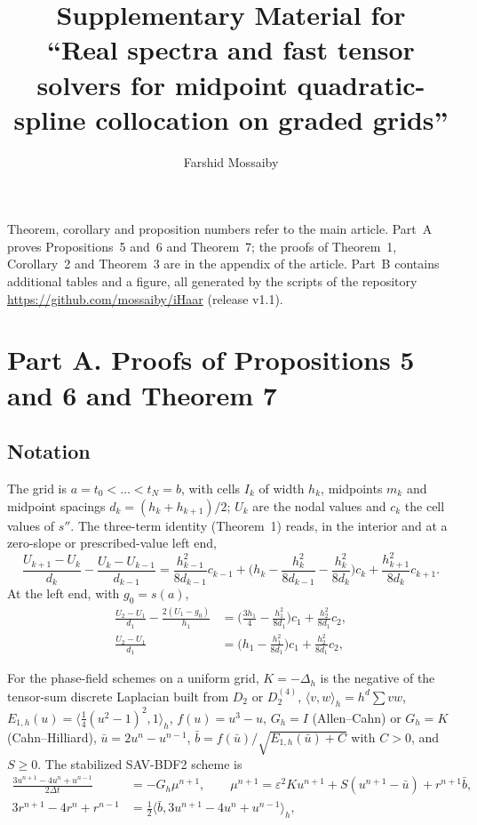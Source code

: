 \documentclass[11pt]{article}
\title{Supplementary Material for\\ ``Real spectra and fast tensor solvers for midpoint quadratic-spline collocation on graded grids''}
\author{Farshid Mossaiby}
\date{}
\begin{document}
\maketitle
\noindent Theorem, corollary and proposition numbers refer to the main article. Part~A proves
Propositions~5 and~6 and Theorem~7; the proofs of Theorem~1, Corollary~2 and Theorem~3 are in the appendix of
the article. Part~B contains additional tables and a figure, all generated by the scripts of the repository
\url{https://github.com/mossaiby/iHaar} (release v1.1).

\section*{Part A. Proofs of Propositions 5 and 6 and Theorem 7}
\subsection*{Notation}
The grid is $a=t_0<\dots<t_N=b$, with cells $I_k$ of width $h_k$, midpoints $m_k$ and midpoint spacings
$d_k=(h_k+h_{k+1})/2$; $U_k$ are the nodal values and $c_k$ the cell values of $s''$. The three-term identity
(Theorem~1) reads, in the interior and at a zero-slope or prescribed-value left end,
\begin{equation}\label{eq:interior}
\frac{U_{k+1}-U_k}{d_k}-\frac{U_k-U_{k-1}}{d_{k-1}}
=\frac{h_{k-1}^2}{8d_{k-1}}c_{k-1}+\Big(h_k-\frac{h_k^2}{8d_{k-1}}-\frac{h_k^2}{8d_k}\Big)c_k+\frac{h_{k+1}^2}{8d_k}c_{k+1}.
\end{equation}
At the left end, with $g_0=s(a)$,
\begin{align}
\frac{U_2-U_1}{d_1}-\frac{2(U_1-g_0)}{h_1}&=\Big(\frac{3h_1}{4}-\frac{h_1^2}{8d_1}\Big)c_1+\frac{h_2^2}{8d_1}c_2 ,\label{eq:dirrow}\\
\frac{U_2-U_1}{d_1}&=\Big(h_1-\frac{h_1^2}{8d_1}\Big)c_1+\frac{h_2^2}{8d_1}c_2 ,\label{eq:neurow}
\end{align}

For the phase-field schemes on a uniform grid, $K=-\Delta_h$ is the negative of the tensor-sum discrete
Laplacian built from $D_2$ or $D_2^{(4)}$, $\langle v,w\rangle_h=h^d\sum vw$,
$E_{1,h}(u)=\langle\frac14(u^2-1)^2,1\rangle_h$, $f(u)=u^3-u$, $G_h=I$ (Allen--Cahn) or $G_h=K$
(Cahn--Hilliard), $\bar u=2u^n-u^{n-1}$, $\bar b=f(\bar u)/\sqrt{E_{1,h}(\bar u)+C}$ with $C>0$, and $S\ge0$.
The stabilized SAV-BDF2 scheme is
\begin{align}
\frac{3u^{n+1}-4u^n+u^{n-1}}{2\Delta t}&=-G_h\mu^{n+1},\qquad
\mu^{n+1}=\varepsilon^2Ku^{n+1}+S(u^{n+1}-\bar u)+r^{n+1}\bar b,\label{eq:sav1}\\
3r^{n+1}-4r^n+r^{n-1}&=\tfrac12\langle\bar b,3u^{n+1}-4u^n+u^{n-1}\rangle_h,\label{eq:sav2}
\end{align}
\end{document}
